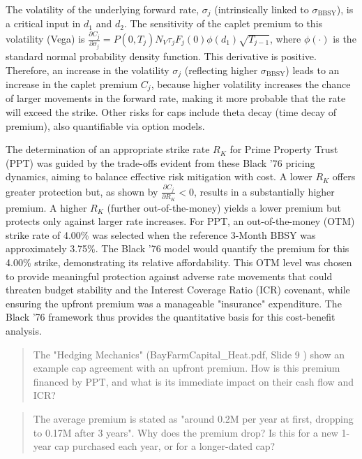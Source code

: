 \documentclass[11pt, a4paper, british]{article}
\begin{document}
The volatility of the underlying forward rate, $\sigma_j$ (intrinsically linked to $\sigma_{\text{BBSY}}$), is a critical input in $d_1$ and $d_2$. The sensitivity of the caplet premium to this volatility (Vega) is $\frac{\partial C_j}{\partial \sigma_j} = P(0, T_j) N_V \tau_j F_j(0) \phi(d_1) \sqrt{T_{j-1}}$, where $\phi(\cdot)$ is the standard normal probability density function. This derivative is positive. Therefore, an increase in the volatility $\sigma_j$ (reflecting higher $\sigma_{\text{BBSY}}$) leads to an increase in the caplet premium $C_j$, because higher volatility increases the chance of larger movements in the forward rate, making it more probable that the rate will exceed the strike. Other risks for caps include theta decay (time decay of premium), also quantifiable via option models.

The determination of an appropriate strike rate $R_K$ for Prime Property Trust (PPT) was guided by the trade-offs evident from these Black '76 pricing dynamics, aiming to balance effective risk mitigation with cost. A lower $R_K$ offers greater protection but, as shown by $\frac{\partial C_j}{\partial R_K} < 0$, results in a substantially higher premium. A higher $R_K$ (further out-of-the-money) yields a lower premium but protects only against larger rate increases. For PPT, an out-of-the-money (OTM) strike rate of 4.00\% was selected when the reference 3-Month BBSY was approximately 3.75\%. The Black '76 model would quantify the premium for this 4.00\% strike, demonstrating its relative affordability. This OTM level was chosen to provide meaningful protection against adverse rate movements that could threaten budget stability and the Interest Coverage Ratio (ICR) covenant, while ensuring the upfront premium was a manageable "insurance" expenditure. The Black '76 framework thus provides the quantitative basis for this cost-benefit analysis.


\newpage

\begin{quote}
    The "Hedging Mechanics" (BayFarmCapital_Heat.pdf, Slide 9 ) show an example cap agreement with an upfront premium. How is this premium financed by PPT, and what is its immediate impact on their cash flow and ICR?
\end{quote}

\newpage

\begin{quote}
    The average premium is stated as "around 0.2M per year at first, dropping to 0.17M after 3 years". Why does the premium drop? Is this for a new 1-year cap purchased each year, or for a longer-dated cap?
\end{quote}
\end{document}
